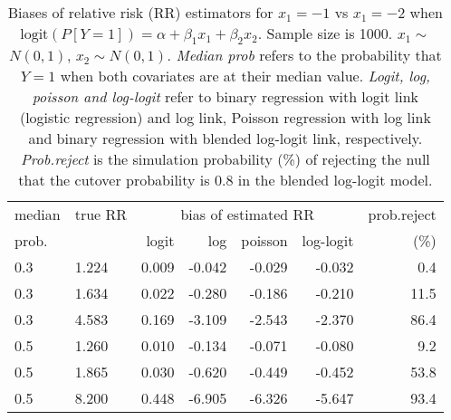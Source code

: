 \documentclass[12pt,a4paper]{article}
\begin{document}
\begin{table}[H] 
\small\sf\centering 
\caption{Biases of relative risk (RR) estimators for $x_1=-1$ vs $x_1=-2$ when $\mbox{logit}(P[Y=1])=\alpha+\beta_1 x_1 + \beta_2 x_2$. Sample size is 1000. $x_1 \sim $$N(0,1)$, $x_2 \sim N(0,1)$. {\it Median prob} refers to the probability that $Y=1$ when both covariates are at their median value. {\it Logit, log, poisson and log-logit} refer to binary regression with logit link (logistic regression) and log link, Poisson regression with log link and binary regression with blended log-logit link, respectively. {\it Prob.reject} is the simulation probability (\%) of rejecting the null that the cutover probability is $0.8$ in the blended log-logit model.} 
\begin{tabular}{llrrrrr} 
\toprule 
median & true RR & \multicolumn{4}{c}{bias of estimated RR} & prob.reject \\ 
prob. & & logit & log & poisson & log-logit  & (\%) \\ \midrule 
0.3 & 1.224 & 0.009 & -0.042 & -0.029 & -0.032 &  0.4 \\  
0.3 & 1.634 & 0.022 & -0.280 & -0.186 & -0.210 & 11.5 \\  
0.3 & 4.583 & 0.169 & -3.109 & -2.543 & -2.370 & 86.4 \\  
0.5 & 1.260 & 0.010 & -0.134 & -0.071 & -0.080 &  9.2 \\  
0.5 & 1.865 & 0.030 & -0.620 & -0.449 & -0.452 & 53.8 \\  
0.5 & 8.200 & 0.448 & -6.905 & -6.326 & -5.647 & 93.4 \\  
\bottomrule 
\end{tabular} 
\end{table} 
\end{document}
